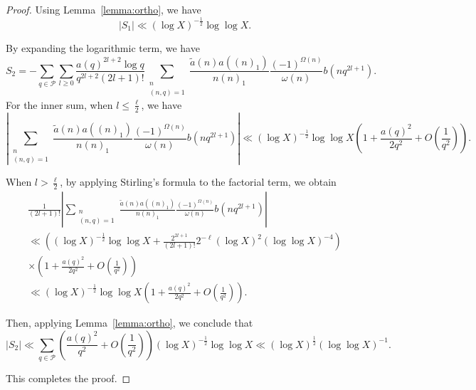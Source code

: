 \documentclass[12pt,reqno]{amsart}
\numberwithin{equation}{section}
\theoremstyle{plain}
\theoremstyle{definition}
\theoremstyle{remark}
\begin{document}
\begin{proof}
Using Lemma~\ref{lemma:ortho}, we have
\begin{equation*}
 |S_1|\ll (\log X)^{-\frac{1}{2}}\log\log X.
\end{equation*}

By expanding the logarithmic term, we have
\begin{equation*}
S_2 =
 - \sum_{q \in \mathcal{P}}
 \sum_{l \geq 0}
 \frac{a(q)^{2l+2} \log q}{q^{2l+2} (2l+1)!}
 \sum_{\substack{n \\ (n,q) = 1}}
 \frac{\tilde{a}(n) a((n)_1)}{n (n)_1}
 \frac{(-1)^{\Omega(n)}}{\omega(n)}
b(n q^{2l+1}).
\end{equation*}
For the inner sum, when \( l \leq \frac{\ell}{2} \), we have
\begin{equation*}
   \left| \sum_{\substack{n \\ (n,q) = 1}}
   \frac{\tilde{a}(n) a((n)_1)}{n (n)_1}
\frac{(-1)^{\Omega(n)}}{\omega(n)}
   b(n q^{2l+1}) \right|
   \ll
   (\log X)^{-\frac{1}{2}} \log\log X
   \left( 1 + \frac{a(q)^2}{2q^2} + O\left( \frac{1}{q^2} \right) \right).
\end{equation*}

When \( l > \frac{\ell}{2} \), by applying Stirling’s formula to the factorial term, we obtain
\begin{multline*}
  \frac{1}{(2l+1)!} \left| \sum_{\substack{n \\ (n,q) = 1}}
  \frac{\tilde{a}(n) a((n)_1)}{n (n)_1}
  \frac{(-1)^{\Omega(n)}}{\omega(n)}
b(n q^{2l+1}) \right|
 \\ \ll
  \left( (\log X)^{-\frac{1}{2}} \log\log X +
  \frac{2^{2l+1}}{(2l+1)!} 2^{-\ell}
  (\log X)^2 (\log\log X)^{-4} \right)
  \\
  \times \left( 1 + \frac{a(q)^2}{2q^2} + O\left( \frac{1}{q^2} \right) \right)
  \\ \ll
  (\log X)^{-\frac{1}{2}} \log\log X
  \left( 1 + \frac{a(q)^2}{2q^2} + O\left( \frac{1}{q^2} \right) \right).
\end{multline*}

Then, applying Lemma~\ref{lemma:ortho}, we conclude that
\begin{equation*}
  |S_2| \ll
  \sum_{q \in \mathcal{P}}
  \left( \frac{a(q)^2}{q^2} + O\left( \frac{1}{q^2} \right) \right)
  (\log X)^{-\frac{1}{2}} \log\log X
  \ll
  (\log X)^{\frac{1}{2}} (\log\log X)^{-1}.
\end{equation*}

This completes the proof.
\end{proof}
\end{document}
